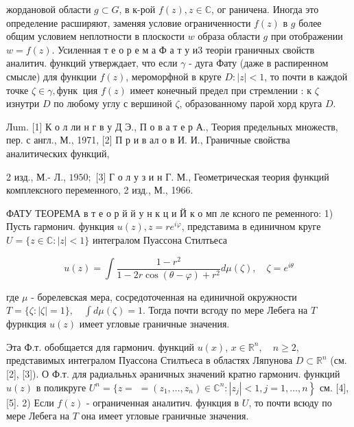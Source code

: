 \documentclass[10pt]{article}
\begin{document}
жордановой области $g \subset G$, в к-рой $f(z), z \in \mathbb{C}$, ог раничена. Иногда это определение расширяют, заменяя условие ограниченности $f(z)$ в $g$ более общим условием неплотности в плоскости $w$ образа области $g$ при отображении $w=f(z)$. Усиленная т е о р е м а Ф а т у и3 теоріи граничных свойств аналитич. функций утверждает, что если $\gamma$ - дуга Фату (даже в распиренном смысле) для функции $f(z)$, мероморфной в круге $D:|z|<1$, то почти в каждой точке $\zeta \in \gamma, ф у н к ~$ ция $f(z)$ имеет конечный предел при стремлении : к $\zeta$ изнутри $D$ по любому углу с вершиной $\zeta$, образованному парой хорд круга $D$.



Лum. [1] К о л ли н г в у Д Э., П о в а т е р А., Теория предельных множеств, пер. с англ., М., 1971, [2] П р и в ал о в И. И., Граничные свойства аналитических функций,

2 изд., М.- Л., $1950 ;$ [3] Г о л у з и н Г. М., Геометрическая теория функций комплексного переменного, 2 изд., М., 1966.



ФАТУ ТЕОРЕМА в т е о р й й у н к ц и Й к о мп ле ксного пе ременного: 1) Пусть гармонич. функция $u(z), z=r e^{i \varphi}$, представима в единичном круге $U=\{z \in \mathbb{C}:|z|<1\}$ интегралом Пуассона Стилтьеса



\[

u(z)=\int \frac{1-r^{2}}{1-2 r \cos (\theta-\varphi)+r^{2}} d \mu(\zeta), \quad \zeta=e^{i \theta}

\]



где $\mu$ - борелевская мера, сосредоточенная на единичной окружности $T=\{\zeta:|\zeta|=1\}, \quad \int d \mu(\zeta)=1$. Тогда почти всгоду по мере Лебега на $T$ фурнкция $u(z)$ имеет угловые граничные значения.



Эта Ф.т. обобщается для гармонич. функций $u(x)$, $x \in \mathbb{R}^{n}, \quad n \geqslant 2$, представимых интегралом Пуассона Стилтьеса в областях Ляпунова $D \subset \mathbb{R}^{n}$ (см. [2], [3]). О Ф.т. для радиальньх әраничных значений кратно гармонич. функций $u(z)$ в поликруге $U^{n}=\{z=$ $\left.=\left(z_{1}, \ldots, z_{n}\right) \in \mathbb{C}^{n}:\left|z_{j}\right|<1, j=1, \ldots, n\right\}$ см. [4], [5]. 2) Если $f(z)$ - ограниченная аналитич. функция в $U$, то почти всюду по мере Лебега на $T$ она имеет угловые граничные значения.
\end{document}
